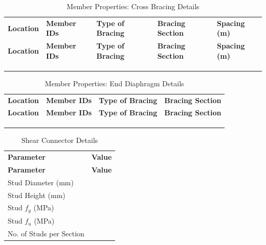 \documentclass[12pt,a4paper]{report}
\numberwithin{figure}{chapter}
\begin{document}
\vspace{0.4em}

\begin{longtable}{|L{2.68cm}|L{2.51cm}|L{2.71cm}|L{2.71cm}|L{2.63cm}|}
\caption{Member Properties:\allowbreak{} Cross Bracing Details}\\
\hline
\textbf{Location} & \textbf{Member IDs} & \textbf{Type of Bracing} & \textbf{Bracing Section} & \textbf{Spacing (m)} \\
\hline
\endfirsthead
\hline
\textbf{Location} & \textbf{Member IDs} & \textbf{Type of Bracing} & \textbf{Bracing Section} & \textbf{Spacing (m)} \\
\hline
\endhead
 &  &  &  &  \\
\hline
 &  &  &  &  \\
\hline
 &  &  &  &  \\
\hline
\end{longtable}

\vspace{0.4em}
\noindent

\begin{longtable}{|L{3.46cm}|L{3.21cm}|L{3.51cm}|L{3.51cm}|}
\caption{Member Properties:\allowbreak{} End Diaphragm Details}\\
\hline
\textbf{Location} & \textbf{Member IDs} & \textbf{Type of Bracing} & \textbf{Bracing Section} \\
\hline
\endfirsthead
\hline
\textbf{Location} & \textbf{Member IDs} & \textbf{Type of Bracing} & \textbf{Bracing Section} \\
\hline
\endhead
 &  &  &  \\
\hline
 &  &  &  \\
\hline
 &  &  &  \\
\hline
\end{longtable}



\label{subsec:shear-connectors}

\vspace{2.2em}

\vspace{0.4em}
\begin{longtable}{|L{7.29cm}|L{7.29cm}|}
\caption{Shear Connector Details}\\
\hline
\textbf{Parameter} & \textbf{Value} \\
\hline
\endfirsthead
\hline
\textbf{Parameter} & \textbf{Value} \\
\hline
\endhead
Stud Diameter (mm) &  \\
\hline
Stud Height (mm) &  \\
\hline
Stud $f_y$ (MPa) &  \\
\hline
Stud $f_u$ (MPa) &  \\
\hline
No. of Studs per Section &  \\
\hline
\end{longtable}
\end{document}
